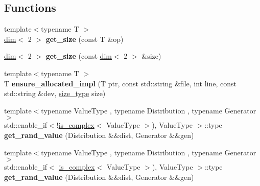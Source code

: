 \subsection*{Functions}
\begin{DoxyCompactItemize}
\item 
\mbox{\label{namespacegko_1_1detail_ae1149e43403f2fd64fffdd5c306a9902}} 
{\footnotesize template$<$typename T $>$ }\\\hyperlink{structgko_1_1dim}{dim}$<$ 2 $>$ {\bfseries get\+\_\+size} (const T \&op)
\item 
\mbox{\label{namespacegko_1_1detail_ac3f2e45628ab3dcb09505c692c07dd42}} 
\hyperlink{structgko_1_1dim}{dim}$<$ 2 $>$ {\bfseries get\+\_\+size} (const \hyperlink{structgko_1_1dim}{dim}$<$ 2 $>$ \&size)
\item 
\mbox{\label{namespacegko_1_1detail_a55e38d5a149db2c81ee69838874a4eb1}} 
{\footnotesize template$<$typename T $>$ }\\T {\bfseries ensure\+\_\+allocated\+\_\+impl} (T ptr, const std\+::string \&file, int line, const std\+::string \&dev, \hyperlink{namespacegko_a6e5c95df0ae4e47aab2f604a22d98ee7}{size\+\_\+type} size)
\item 
\mbox{\label{namespacegko_1_1detail_a6168982a91c6ff03e89ed3a2cb520b35}} 
{\footnotesize template$<$typename Value\+Type , typename Distribution , typename Generator $>$ }\\std\+::enable\+\_\+if$<$!\hyperlink{namespacegko_a9b3e79911bb6145d7ba865dbe436b915}{is\+\_\+complex}$<$ Value\+Type $>$), Value\+Type $>$\+::type {\bfseries get\+\_\+rand\+\_\+value} (Distribution \&\&dist, Generator \&\&gen)
\item 
\mbox{\label{namespacegko_1_1detail_aa4d73241c4829436ebcbd375a4bdef4f}} 
{\footnotesize template$<$typename Value\+Type , typename Distribution , typename Generator $>$ }\\std\+::enable\+\_\+if$<$ \hyperlink{namespacegko_a9b3e79911bb6145d7ba865dbe436b915}{is\+\_\+complex}$<$ Value\+Type $>$), Value\+Type $>$\+::type {\bfseries get\+\_\+rand\+\_\+value} (Distribution \&\&dist, Generator \&\&gen)
\item 
\mbox{\label{namespacegko_1_1detail_a48b0190d38b9eed2d9fb2f775b534728}} 

\end{DoxyCompactItemize}
